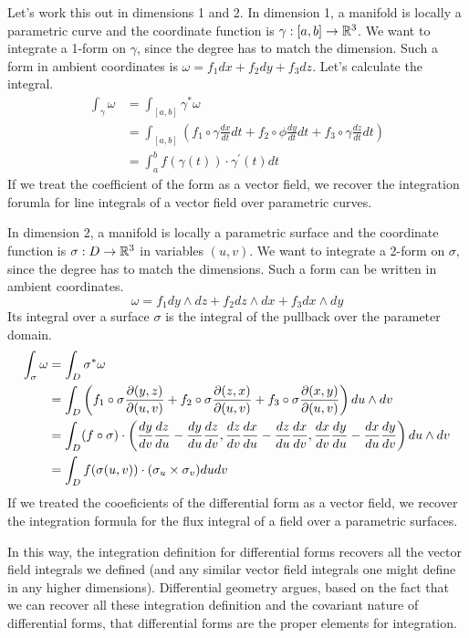 \documentclass[fleqn,letterpaper]{report}
\begin{document}
Let's work this out in dimensions 1 and 2. In dimension 1, a
manifold is locally a parametric curve and the coordinate
function is $\gamma: [a,b] \rightarrow \mathbb{R}^3$. We want to
integrate a 1-form on $\gamma$, since the degree has to match
the dimension. Such a form in ambient coordinates is $\omega =
f_1 dx + f_2 dy + f_3 dz$. Let's calculate the integral.
\begin{align*}
\int_\gamma \omega & = \int_{[a,b]} \gamma^* \omega \\
& = \int_{[a,b]} \left( f_1 \circ \gamma \frac{dx}{dt} dt +
f_2 \circ \phi \frac{dy}{dt} dt + f_3 \circ \gamma
\frac{dz}{dt} dt \right) \\
& = \int_a^b f(\gamma(t)) \cdot \gamma^\prime(t) dt 
\end{align*}
If we treat the coefficient of the form as a vector field, we
recover the integration forumla for line integrals of a vector
field over parametric curves. 

In dimension 2, a manifold is locally a parametric surface
and the coordinate function is $\sigma: D \rightarrow \mathbb{R}^3$
in variables $(u,v)$. We want to integrate a 2-form on
$\sigma$, since the degree has to match the dimensions. Such
a form can be written in ambient coordinates.
\begin{equation*}
\omega = f_1 dy\wedge dz + f_2 dz\wedge dx + f_3 dx \wedge dy 
\end{equation*}
Its integral over a surface $\sigma$ is the integral of the
pullback over the parameter domain.
\begin{align*}
\int_\sigma \omega & = \int_D \sigma^* \omega \\
& = \int_D \left( 
f_1 \circ \sigma \frac{\partial (y,z)}{\partial (u,v)} + 
f_2 \circ \sigma \frac{\partial (z,x)}{\partial (u,v)} + 
f_3 \circ \sigma \frac{\partial (x,y)}{\partial (u,v)} \right) du
\wedge dv \\
& = \int_D (f \circ \sigma) \cdot \left( 
\frac{dy}{dv} \frac{dz}{du} - \frac{dy}{du} \frac{dz}{dv}, 
\frac{dz}{dv} \frac{dx}{du} - \frac{dz}{du} \frac{dx}{dv}, 
\frac{dx}{dv} \frac{dy}{du} - \frac{dx}{du} \frac{dy}{dv}
 \right) du \wedge dv \\
& = \int_D f(\sigma(u,v)) \cdot (\sigma_u \times \sigma_v) du
dv
\end{align*}
If we treated the cooeficients of the differential form as a
vector field, we recover the integration formula for the flux
integral of a field over a parametric surfaces. 

In this way, the integration definition for differential forms
recovers all the vector field integrals we defined (and any
similar vector field integrals one might define in any higher
dimensions). Differential geometry argues, based on the fact
that we can recover all these integration definition and the
covariant nature of differential forms, that
differential forms are the proper elements for integration.
\end{document}
